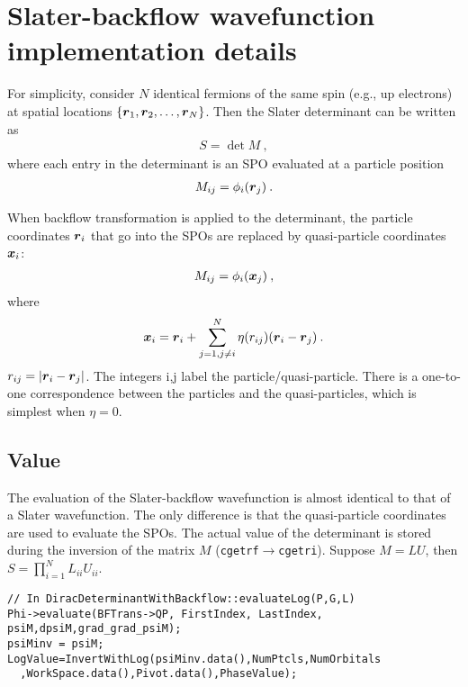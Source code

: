 \section{Slater-backflow wavefunction implementation details}

For simplicity, consider $N$ identical fermions of the same spin (e.g., up electrons) at spatial locations $\{\boldsymbol{r}_1,\boldsymbol{r}_2,\dots,\boldsymbol{r}_{N}\}$. Then the Slater determinant can be written as
\begin{align}
S=\det M\:,
\end{align}
where each entry in the determinant is an SPO evaluated at a particle position
\begin{align}
M_{ij} = \phi_i(\boldsymbol{r}_j)\:.
\end{align}

When backflow transformation is applied to the determinant, the particle coordinates $\boldsymbol{r}_i$ that go into the SPOs are replaced by quasi-particle coordinates $\boldsymbol{x}_i$:
\begin{align}
M_{ij} = \phi_i(\boldsymbol{x}_j)\:, \label{eq:psiM}
\end{align}
where
\begin{align}
\boldsymbol{x}_i=\boldsymbol{r}_i+\sum\limits_{j=1,j\neq i}^N\eta(r_{ij})(\boldsymbol{r}_i-\boldsymbol{r}_j)\:. \label{eq:quasi}
\end{align}
$r_{ij}=\vert\boldsymbol{r}_i-\boldsymbol{r}_j\vert$. The integers i,j label the particle/quasi-particle. There is a one-to-one correspondence between the particles and the quasi-particles, which is simplest when $\eta=0$.

\subsection{Value}
The evaluation of the Slater-backflow wavefunction is almost identical to that of a Slater wavefunction. The only difference is that the quasi-particle coordinates are used to evaluate the SPOs. The actual value of the determinant is stored during the inversion of the matrix $M$ (\verb|cgetrf|$\rightarrow$\verb|cgetri|). Suppose $M=LU$, then $S=\prod\limits_{i=1}^N L_{ii} U_{ii}$. \\

\begin{lstlisting}
// In DiracDeterminantWithBackflow::evaluateLog(P,G,L)
Phi->evaluate(BFTrans->QP, FirstIndex, LastIndex, psiM,dpsiM,grad_grad_psiM);
psiMinv = psiM;
LogValue=InvertWithLog(psiMinv.data(),NumPtcls,NumOrbitals
  ,WorkSpace.data(),Pivot.data(),PhaseValue);
\end{lstlisting}

